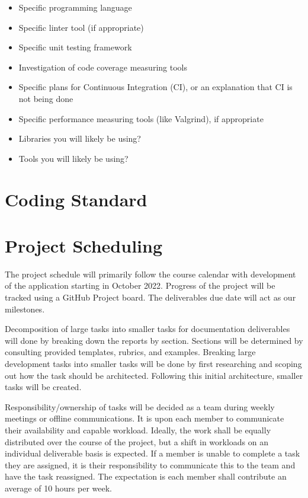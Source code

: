 \documentclass{article}
\begin{document}
\begin{itemize}
  \item Specific programming language
  \item Specific linter tool (if appropriate)
  \item Specific unit testing framework
  \item Investigation of code coverage measuring tools
  \item Specific plans for Continuous Integration (CI), or an explanation that CI is not being done
  \item Specific performance measuring tools (like Valgrind), if appropriate
  \item Libraries you will likely be using?
  \item Tools you will likely be using?
\end{itemize}

\section{Coding Standard}

\section{Project Scheduling}


The project schedule will primarily follow the course calendar with development of the application
starting in October 2022. Progress of the project will be tracked using a GitHub Project board. The
deliverables due date will act as our milestones.

Decomposition of large tasks into smaller tasks for documentation deliverables will done by
breaking down the reports by section. Sections will be determined by consulting provided templates,
rubrics, and examples. Breaking large development tasks into smaller tasks will be done by first
researching and scoping out how the task should be architected. Following this initial
architecture, smaller tasks will be created.

Responsibility/ownership of tasks will be decided as a team during weekly meetings or offline
communications. It is upon each member to communicate their availability and capable workload.
Ideally, the work shall be equally distributed over the course of the project, but a shift in
workloads on an individual deliverable basis is expected. If a member is unable to complete a task
they are assigned, it is their responsibility to communicate this to the team and have the task
reassigned. The expectation is each member shall contribute an average of 10 hours per week.
\end{document}
